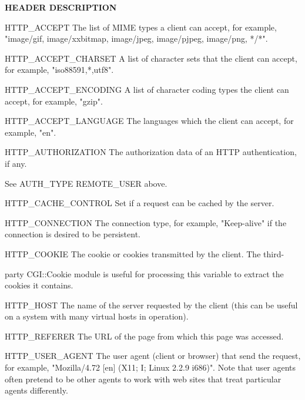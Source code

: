 \documentclass[a4paper,11pt]{book}
\begin{document}
\noindent 

\noindent \textbf{HEADER DESCRIPTION}

\noindent 

\noindent HTTP\_ACCEPT The list of MIME types a client can accept, for example, "image/gif, image/xxbitmap, image/jpeg, image/pjpeg, image/png, */*".

\noindent 

\noindent HTTP\_ACCEPT\_CHARSET A list of character sets that the client can accept, for example, "iso88591,*,utf8".

\noindent 

\noindent HTTP\_ACCEPT\_ENCODING A list of character coding types the client can accept, for example, "gzip".

\noindent 

\noindent HTTP\_ACCEPT\_LANGUAGE The languages which the client can accept, for example, "en".

\noindent 

\noindent HTTP\_AUTHORIZATION The authorization data of an HTTP authentication, if any.

\noindent See AUTH\_TYPE REMOTE\_USER above.

\noindent 

\noindent HTTP\_CACHE\_CONTROL Set if a request can be cached by the server.

\noindent 

\noindent HTTP\_CONNECTION The connection type, for example, "Keep-alive" if the connection is desired to be persistent.

\noindent 

\noindent HTTP\_COOKIE The cookie or cookies transmitted by the client. The third-

\noindent party CGI::Cookie module is useful for processing this variable to extract the cookies it contains.

\noindent 

\noindent HTTP\_HOST The name of the server requested by the client (this can be useful on a system with many virtual hosts in operation).

\noindent 

\noindent HTTP\_REFERER The URL of the page from which this page was accessed.

\noindent 

\noindent HTTP\_USER\_AGENT The user agent (client or browser) that send the request, for example, "Mozilla/4.72 [en] (X11; I; Linux 2.2.9 i686)". Note that user agents often pretend to be other agents to work with web sites that treat particular agents differently.
\end{document}
